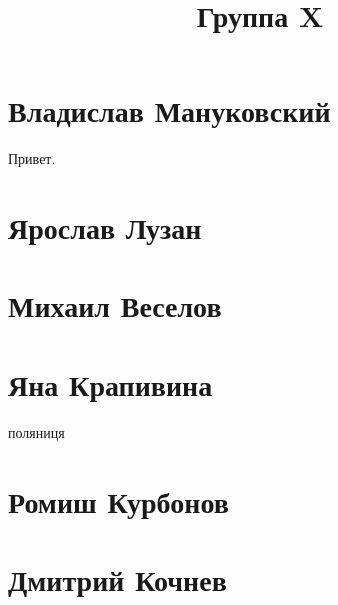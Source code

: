 \documentclass{article}
\title{Группа X}
\begin{document}
\section*{Владислав Мануковский}
Привет.
\section*{Ярослав Лузан}

\section*{Михаил Веселов}

\section*{Яна Крапивина}
поляниця
\section*{Ромиш Курбонов}

\section*{Дмитрий Кочнев}
\end{document}
